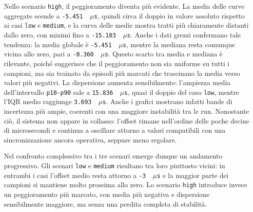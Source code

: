 Nello scenario \texttt{high}, il peggioramento diventa più evidente. La media
delle curve aggregate scende a \texttt{-5.451 \,$\mu$s}, quindi circa il doppio
in valore assoluto rispetto ai casi \texttt{low} e \texttt{medium}, e la curva delle
medie mostra tratti più chiaramente distanti dallo zero, con minimi fino a
\texttt{-15.103 \,$\mu$s}. Anche i dati grezzi confermano tale tendenza: la media
globale è \texttt{-5.451 \,$\mu$s}, mentre la mediana resta comunque vicina allo zero,
pari a \texttt{-0.360 \,$\mu$s}. Questo scarto tra media e mediana è rilevante, poiché
suggerisce che il peggioramento non sia uniforme su tutti i campioni, ma sia
trainato da episodi più marcati che trascinano la media verso valori più
negativi. La dispersione aumenta sensibilmente: l'ampiezza media dell'intervallo
\texttt{p10-p90} sale a \texttt{15.836 \,$\mu$s}, quasi il doppio del caso \texttt{low},
mentre l'IQR medio raggiunge \texttt{3.693 \,$\mu$s}. Anche i grafici mostrano infatti
bande di incertezza più ampie, coerenti con una maggiore instabilità tra le run. Nonostante
ciò, il sistema non appare in collasso: l'offset rimane nell'ordine delle poche decine
di microsecondi e continua a oscillare attorno a valori compatibili con una sincronizzazione
ancora operativa, seppure meno regolare.

Nel confronto complessivo tra i tre scenari emerge dunque un andamento
progressivo. Gli scenari \texttt{low} e \texttt{medium} risultano tra loro piuttosto
vicini: in entrambi i casi l'offset medio resta attorno a \texttt{-3 \,$\mu$s} e la
maggior parte dei campioni si mantiene molto prossima allo zero. Lo scenario
\texttt{high} introduce invece un peggioramento più marcato, con media più
negativa e dispersione sensibilmente maggiore, ma senza una perdita completa di stabilità.

